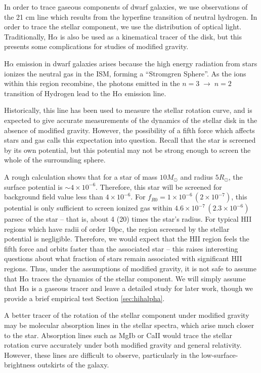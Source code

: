 \documentclass[useAMS,usenatbib,twocolumn]{mn2e}
\newcommand{\ha}{H$\alpha$}
\begin{document}
In order to trace gaseous components of dwarf galaxies,
we use observations of the 21 cm line which results from the hyperfine
transition of neutral hydrogen.
In order to trace the stellar component, we use the distribution of optical
light.  Traditionally, \ha{} is also be used as a kinematical tracer
of the disk, but this presents some complications for studies of
modified gravity.

\ha{} emission in dwarf galaxies arises because
the high energy radiation from stars ionizes the neutral gas in the ISM,
forming a  ``Stromgren Sphere''.
As the ions within this region recombine,
the photons emitted in the $n=3\;\to\;n=2$ transition
of Hydrogen lead to the \ha{} emission line.

Historically, this line has been
used to measure the stellar rotation curve, and is expected to give accurate
measurements of the dynamics of the stellar disk in the absence of modified
gravity. However, the possibility of a fifth force which
affects stars and gas calls this expectation into question.
Recall that the star is screened by its own potential, but this potential
may not be strong enough to screen the whole of the surrounding sphere.

A rough calculation shows that for a star of mass $10 M_\odot$ and radius
$5 R_\odot$, the surface potential is $\sim 4\times10^{-6}$. Therefore, this
star will be screened for background field value less than $4\times10^{-6}$.
For $f_{R0} = 1\times10^{-6}\,(2\times10^{-7})$, this potential is only
sufficient to screen ionized gas within
$4.6\times10^{-7}\,(2.3\times10^{-6})$ parsec of the star -- that is, about
4 (20) times the star's radius.
For typical HII regions which have radii of order 10pc, the region screened
by the stellar potential is negligible.  Therefore, we would expect  that the
HII region feels the fifth force and 
orbits faster than the associated star --
this raises interesting questions about what fraction of stars remain
associated with significant HII regions. Thus, under the assumptions of
modified gravity,  it is not safe to assume that \ha{}
traces the dynamics of the stellar component.
We will simply assume that \ha{} is a gaseous tracer and leave 
a detailed study for later work, though we provide a brief empirical
test Section \ref{sec:hihalpha}.

A better tracer of the rotation of the stellar component under modified gravity
may be molecular absorption lines in the stellar spectra, which arise much
closer to the star. Absorption lines such as MgIb or CaII would trace the
stellar rotation curve accurately under both modified gravity and general
relativity. However, these lines are difficult to observe, particularly
in the low-surface-brightness outskirts of the galaxy. 
\end{document}
